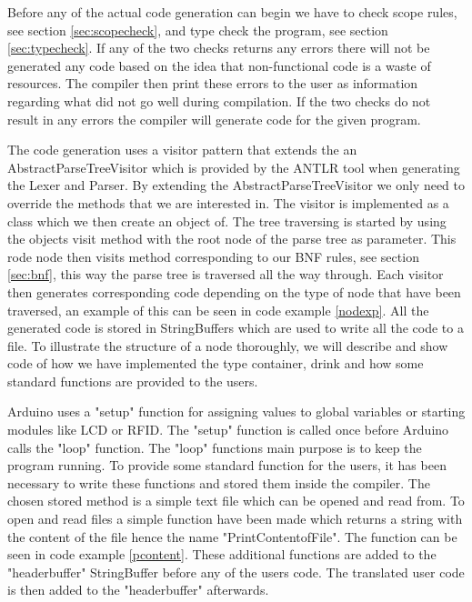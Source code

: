 Before any of the actual code generation can begin we have to check scope rules, see section \ref{sec:scopecheck}, and type check the program, see section \ref{sec:typecheck}. If any of the two checks returns any errors there will not be generated any code based on the idea that non-functional code is a waste of resources. The compiler then print these errors to the user as information regarding what did not go well during compilation. If the two checks do not result in any errors the compiler will generate code for the given program.


The code generation uses a visitor pattern that extends the an AbstractParseTreeVisitor which is provided by the ANTLR tool when generating the Lexer and Parser. By extending the AbstractParseTreeVisitor we only need to override the methods that we are interested in. The visitor is implemented as a class which we then create an object of. The tree traversing is started by using the objects visit method with the root node of the parse tree as parameter. This rode node then visits method corresponding to our BNF rules, see section \ref{sec:bnf}, this way the parse tree is traversed all the way through. Each visitor then generates corresponding code depending on the type of node that have been traversed, an example of this can be seen in code example \ref{nodexp}. All the generated code is stored in StringBuffers which are used to write all the code to a file. To illustrate the structure of a node thoroughly, we will describe and show code of how we have implemented the type container, drink and how some standard functions are provided to the users.


Arduino uses a "setup" function for assigning values to global variables or starting modules like LCD or RFID. The "setup" function is called once before Arduino calls the "loop" function. The "loop" functions main purpose is to keep the program running. To provide some standard function for the users, it has been necessary to write these functions and stored them inside the compiler. The chosen stored method is a simple text file which can be opened and read from. To open and read files a simple function have been made which returns a string with the content of the file hence the name "PrintContentofFile". The function can be seen in code example \ref{pcontent}. These additional functions are added to the "headerbuffer" StringBuffer before any of the users code. The translated user code is then added to the "headerbuffer" afterwards.

